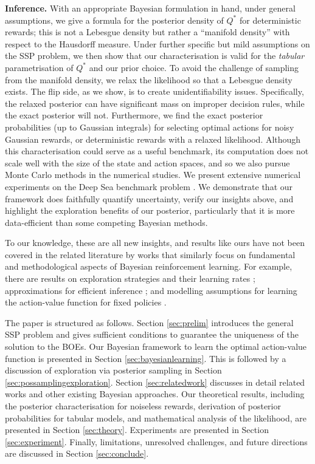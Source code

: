 \documentclass{amsart}
\begin{document}
\textbf{Inference.} With an appropriate Bayesian formulation in hand, under general assumptions, we give a formula for the posterior density of $Q^\ast$ for deterministic rewards; this is not a Lebesgue density but rather a ``manifold density'' with respect to the Hausdorff measure. Under further specific but mild assumptions on the SSP problem, we then show that our characterisation is valid for the {\it tabular} parametrisation of $Q^*$ and our prior choice. To avoid the challenge of sampling from the manifold density, we relax the likelihood so that a Lebesgue density exists. The flip side, as we show, is to create unidentifiability issues. Specifically, the relaxed posterior can have significant mass on improper decision rules, while the exact posterior will not. Furthermore, we find the exact posterior probabilities (up to Gaussian integrals) for selecting optimal actions for noisy Gaussian rewards, or deterministic rewards with a relaxed likelihood. Although this characterisation could serve as a useful benchmark, its computation does not scale well with the size of the state and action spaces, and so we also pursue Monte Carlo methods in the numerical studies. We present extensive numerical experiments on the Deep Sea benchmark problem \citep{randomisedvaluefunction}. We demonstrate that our framework does faithfully quantify uncertainty, verify our insights above, and highlight the exploration benefits of our posterior, particularly that it is more data-efficient than some competing Bayesian methods.

To our knowledge, these are all new insights, and results like ours have not been covered in the related literature by works that 
similarly focus on fundamental and methodological aspects of Bayesian reinforcement learning. For example, there are results on exploration strategies \citep{osband2013moreefficient,psrlinfhorizon,bayesoptiamlpolicy,psrl-ssp} and their learning rates \citep{whypsrlbetterthanoptimism,rlsvi_regret_russo,provablyefficientpossampling}; approximations for efficient inference \citep{bootstraposband,randomisedpriorwithensembleosband,randomisedvaluefunction,dropout,bdqn_azizz,tdsmc,qlearn_sgld}; and modelling assumptions for learning the action-value function for fixed policies \citep{gpsarsa_engel,kalmantd,bayesianbellmanoperator}.


The paper is structured as follows. Section \ref{sec:prelim} introduces the general SSP problem and gives sufficient conditions to guarantee the uniqueness of the solution to the BOEs. Our Bayesian framework to learn the optimal action-value function is presented in Section \ref{sec:bayesianlearning}. This is followed by a discussion of exploration via posterior sampling in Section \ref{sec:possamplingexploration}. Section \ref{sec:relatedwork} discusses in detail related works and other existing Bayesian approaches. Our theoretical results, including the posterior characterisation for noiseless rewards, derivation of posterior probabilities for tabular models, and mathematical analysis of the likelihood, are presented in Section \ref{sec:theory}. Experiments are presented in Section \ref{sec:experiment}. Finally, limitations, unresolved challenges, and future directions are discussed in Section \ref{sec:conclude}.
\end{document}
